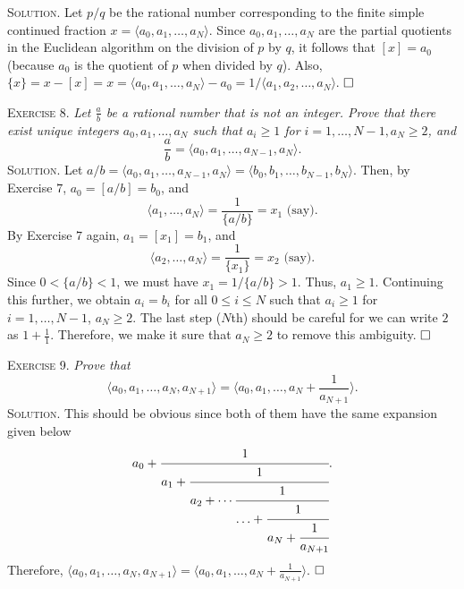 \documentclass[11pt, leqno]{article}
\newcommand{\done}{\ensuremath{\hfill\square}}
\begin{document}
\textsc{Solution}. Let $p/q$ be the rational number corresponding to the finite simple continued fraction $x=\langle a_0, a_1,\ldots,a_N \rangle$. Since $a_0, a_1, \ldots, a_N$ are the partial quotients in the Euclidean algorithm on the division of $p$ by $q$, it follows that $[x] = a_0$ (because $a_0$ is the quotient of $p$ when divided by $q$). Also, $\{x\} = x - [x] = x=\langle a_0, a_1,\ldots,a_N \rangle - a_0 = 1/\langle a_1, a_2,\ldots,a_N \rangle$. \done

\textsc{Exercise 8}. \emph{Let $\frac{a}{b}$ be a rational number that is not an integer. Prove that there exist unique integers $a_0, a_1, \ldots, a_N$ such that $a_i\geq 1$ for $i=1,\ldots, N-1, a_N \geq 2$, and 
\begin{displaymath}
\frac{a}{b} = \langle a_0, a_1, \ldots, a_{N-1}, a_N \rangle.
\end{displaymath}}\textsc{Solution}. Let $a/b = \langle a_0, a_1, \ldots, a_{N-1}, a_N \rangle = \langle b_0, b_1, \ldots, b_{N-1}, b_N \rangle$. Then, by Exercise $7$, $a_0 = [a/b] = b_0$, and 
\begin{displaymath}
\langle a_1, \ldots, a_N \rangle = \frac{1}{\{a/b\}} = x_1 \text{ (say)}.
\end{displaymath}
By Exercise $7$ again, $a_1 = [x_1] = b_1$, and 
\begin{displaymath}
\langle a_2, \ldots, a_N \rangle = \frac{1}{\{x_1\}} = x_2 \text{ (say)}.
\end{displaymath}
Since $0 < \{a/b\} < 1$, we must have $x_1 = 1/\{a/b\} > 1$. Thus, $a_1 \geq 1$.
Continuing this further, we obtain $a_i = b_i$ for all $0 \leq i \leq N$ such that $a_i \geq 1$ for $i = 1, \ldots, N-1$, $a_N \geq 2$. The last step ($N$th) should be careful for we can write $2$ as $1 + \frac{1}{1}$. Therefore, we make it sure that $a_N \geq 2$ to remove this ambiguity. \done

\textsc{Exercise 9}. \emph{Prove that 
\begin{displaymath}
\langle a_0, a_1, \ldots, a_N, a_{N+1} \rangle = \langle a_0, a_1, \ldots, a_N + \frac{1}{a_{N+1}} \rangle.
\end{displaymath}}\textsc{Solution}. This should be obvious since both of them have the same expansion given below
\begin{displaymath}
a_0 + \cfrac{1}{a_1 + \cfrac{1}{a_2 + \cdots \cfrac{1}{\ldots + \cfrac{1}{a_N + \cfrac{1}{a_{N+1}}}}}}.
\end{displaymath}
Therefore, $\langle a_0, a_1, \ldots, a_N, a_{N+1} \rangle = \langle a_0, a_1, \ldots, a_N + \frac{1}{a_{N+1}} \rangle$. \done
\end{document}
